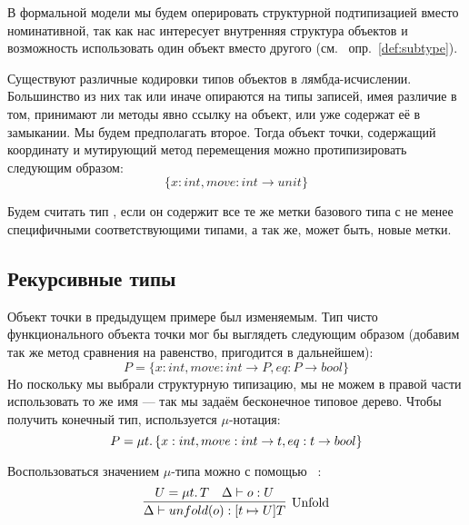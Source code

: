 В формальной модели мы будем оперировать структурной подтипизацией вместо номинативной, так как нас интересует внутренняя структура объектов и возможность использовать один объект вместо другого (см.
~опр.~\ref{def:subtype}).

Существуют различные кодировки типов объектов в лямбда-исчислении.
Большинство из них так или иначе опираются на типы записей, имея различие в том, принимают ли методы явно ссылку на объект, или уже содержат её в замыкании.
Мы будем предполагать второе.
Тогда объект точки, содержащий координату и мутирующий метод перемещения можно протипизировать следующим образом:
\begin{equation}
    \label{eq:mutable-point}
    \{ x : int, move : int \to unit \}
\end{equation}

Будем считать тип , если он содержит все те же метки базового типа с не менее специфичными соответствующими типами, а так же, может быть, новые метки.


\subsection{Рекурсивные типы} \label{subsec:recursive-types}

Объект точки в предыдущем примере был изменяемым.
Тип чисто функционального объекта точки мог бы выглядеть следующим образом (добавим так же метод сравнения на равенство, пригодится в дальнейшем):
\begin{equation*}
    P = \{ x : int, move : int \to P, eq : P \to bool \}
\end{equation*}
Но поскольку мы выбрали структурную типизацию, мы не можем в правой части использовать то же имя --- так мы задаём бесконечное типовое дерево.
Чтобы получить конечный тип, используется $\mu$-нотация:
\begin{equation}
    \label{eq:P}
    P = \mu t \ldotp \{ x : int, move : int \to t, eq : t \to bool \}
\end{equation}

Воспользоваться значением $\mu$-типа можно с помощью ~\cite{cook1989inheritance}:
\begin{equation}
    \label{eq:unfold}
    \infer[\text{Unfold}]{
        \Delta \vdash unfold(o) : [t \mapsto U]T
    }{
        U = \mu t \ldotp T & \Delta \vdash o : U
    }
\end{equation}

